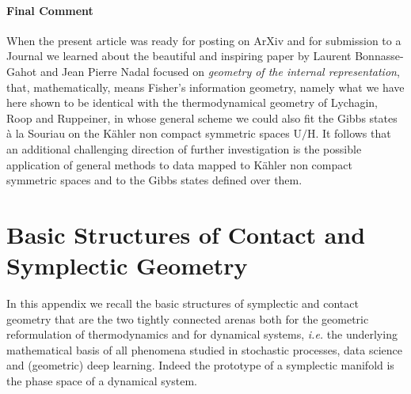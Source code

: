 \documentclass[10pt,a4paper]{article}
\begin{document}
\paragraph{Final Comment} When the present article was ready for posting on ArXiv and for submission to a Journal we learned about the beautiful and inspiring paper by
Laurent Bonnasse-Gahot and Jean Pierre Nadal \cite{nadalcategor} focused on  \textit{geometry of the internal representation}, that, mathematically, means  Fisher's information geometry, namely what we have here shown to be identical with the thermodynamical geometry of
Lychagin, Roop and Ruppeiner, in whose general scheme we could also fit the Gibbs states à la Souriau on the
K\"ahler non compact symmetric spaces $\mathrm{U/H}$. It follows that an additional challenging direction of further investigation is the
possible application of
\cite{nadalcategor} general methods to data mapped to
K\"ahler non compact symmetric spaces and to the Gibbs states defined over them.
\newpage
\appendix
\section{Basic  Structures of Contact and Symplectic Geometry}
\label{geoprobo}
In this appendix we recall the basic structures of symplectic and contact geometry that are the two tightly connected arenas both for the geometric reformulation of thermodynamics and for dynamical systems, \textit{i.e.} the underlying mathematical basis of all phenomena studied in stochastic processes, data science and (geometric) deep learning. Indeed the prototype of a symplectic manifold is the phase space of a dynamical system.
\end{document}
